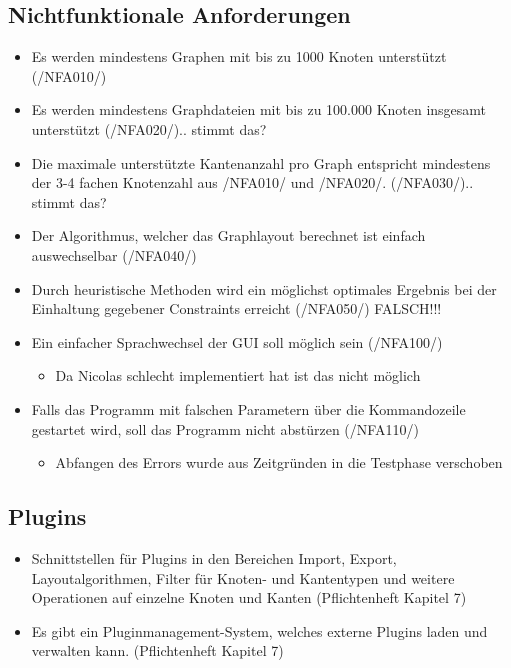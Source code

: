 \subsection{Nichtfunktionale Anforderungen}
\begin{itemize}
	\item Es werden mindestens Graphen mit bis zu 1000 Knoten unterstützt (/NFA010/)
	\item Es werden mindestens Graphdateien mit bis zu 100.000 Knoten insgesamt unterstützt (/NFA020/).. stimmt das?
	\item Die maximale unterstützte Kantenanzahl pro Graph entspricht mindestens der 3-4 fachen Knotenzahl aus /NFA010/ und /NFA020/. (/NFA030/).. stimmt das?
	\item Der Algorithmus, welcher das Graphlayout berechnet ist einfach auswechselbar (/NFA040/)
	\item Durch heuristische Methoden wird ein möglichst optimales Ergebnis bei der Einhaltung gegebener Constraints erreicht (/NFA050/) FALSCH!!!
	\item Ein einfacher Sprachwechsel der GUI soll möglich sein (/NFA100/)
		\begin{itemize}
			\item Da Nicolas schlecht implementiert hat ist das nicht möglich
		\end{itemize}
	\item Falls das Programm mit falschen Parametern über die Kommandozeile gestartet wird, soll das Programm nicht abstürzen (/NFA110/)
		\begin{itemize}
			\item Abfangen des Errors wurde aus Zeitgründen in die Testphase verschoben
		\end{itemize}
\end{itemize}

\subsection{Plugins}
\begin{itemize}
	\item Schnittstellen für Plugins in den Bereichen Import, Export, Layoutalgorithmen, Filter für Knoten- und Kantentypen und weitere Operationen auf einzelne Knoten und Kanten (Pflichtenheft Kapitel 7)
	\item Es gibt ein Pluginmanagement-System, welches externe Plugins laden und verwalten kann. (Pflichtenheft Kapitel 7)
\end{itemize}

